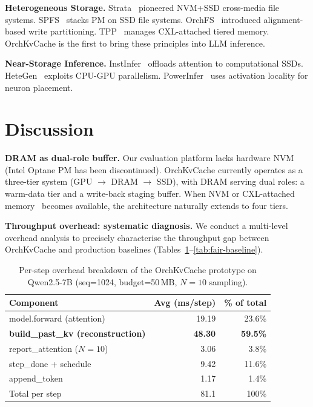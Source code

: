 \documentclass[conference]{IEEEtran}
\begin{document}
\textbf{Heterogeneous Storage.} Strata~\cite{strata} pioneered NVM+SSD cross-media file systems. SPFS~\cite{spfs} stacks PM on SSD file systems. OrchFS~\cite{orchfs} introduced alignment-based write partitioning. TPP~\cite{tpp} manages CXL-attached tiered memory. OrchKvCache is the first to bring these principles into LLM inference.

\textbf{Near-Storage Inference.} InstInfer~\cite{instinfer} offloads attention to computational SSDs. HeteGen~\cite{hetegen} exploits CPU-GPU parallelism. PowerInfer~\cite{powerinfer} uses activation locality for neuron placement.

\section{Discussion}

\textbf{DRAM as dual-role buffer.} Our evaluation platform lacks hardware NVM (Intel Optane PM has been discontinued). OrchKvCache currently operates as a three-tier system (GPU $\to$ DRAM $\to$ SSD), with DRAM serving dual roles: a warm-data tier and a write-back staging buffer. When NVM or CXL-attached memory~\cite{tpp} becomes available, the architecture naturally extends to four tiers.

\textbf{Throughput overhead: systematic diagnosis.}
We conduct a multi-level overhead analysis to precisely characterise the throughput gap between OrchKvCache and production baselines (Tables~\ref{tab:overhead-breakdown}--\ref{tab:fair-baseline}).

\begin{table}[t]
\centering
\caption{Per-step overhead breakdown of the OrchKvCache prototype on Qwen2.5-7B (seq=1024, budget=50\,MB, $N{=}10$ sampling).}
\label{tab:overhead-breakdown}
\small
\begin{tabular}{@{}lrr@{}}
\toprule
Component & Avg (ms/step) & \% of total \\
\midrule
model.forward (attention) & 19.19 & 23.6\% \\
\textbf{build\_past\_kv (reconstruction)} & \textbf{48.30} & \textbf{59.5\%} \\
report\_attention ($N{=}10$) & 3.06 & 3.8\% \\
step\_done + schedule & 9.42 & 11.6\% \\
append\_token & 1.17 & 1.4\% \\
\midrule
Total per step & 81.1 & 100\% \\
\bottomrule
\end{tabular}
\end{table}
\end{document}
